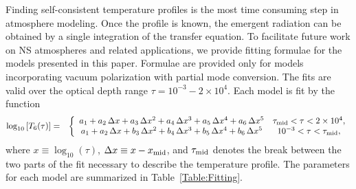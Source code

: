 \documentclass[useAMS,onecolumn,usenatbib,usegraphicx]{mn2e}
\begin{document}
Finding self-consistent temperature profiles is the most time consuming step in atmosphere modeling.  
Once the profile is 
known, the emergent radiation can be obtained by a single integration of the transfer equation.  
To facilitate future work on NS 
atmospheres and related applications, we provide fitting formulae for the models presented in this paper.
Formulae are provided only for models incorporating vacuum polarization with partial mode conversion.
The fits are valid over the optical depth range $\tau=10^{-3}-2\times 10^{4}$.  Each model is fit by the function
\begin{eqnarray}
\log_{10}\left [T_6(\tau)\right ] & = & \left\{
\begin{array}{cc}
a_1+a_2\,\Delta x+a_3\,\Delta x^2+a_4\,\Delta x^3+a_5\,\Delta x^4 + a_6\,\Delta x^5 & 
\tau_{\rm mid} < \tau < 2\times 10^4,\\
a_1+a_2\,\Delta x+b_3\,\Delta x^2+b_4\,\Delta x^3+b_5\,\Delta x^4 + b_6\,\Delta x^5 & 
10^{-3} < \tau < \tau_{\rm mid},
\end{array}\right.
\label{eq:tprofile}
\end{eqnarray}
where $x\equiv\log_{10}(\tau)$, $\Delta x\equiv x-x_{\rm mid}$, 
and $\tau_{\rm mid}$ denotes the break between the two parts of the fit necessary to 
describe the temperature profile.  The parameters for each model are summarized in Table~\ref{Table:Fitting}.
\end{document}
